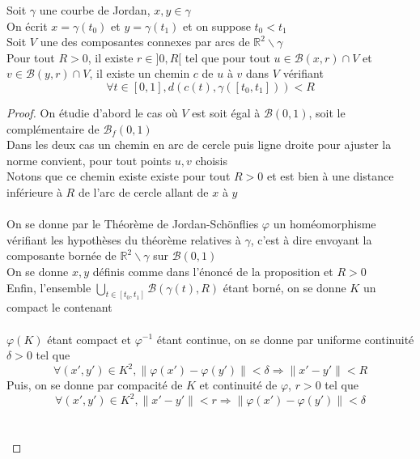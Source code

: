\documentclass{article}
\begin{document}
\begin{flushleft}
\begin{tcolorbox}[colback = purple!20!white, colframe = purple!60!white, title = Proposition 7]
    Soit $\gamma$ une courbe de Jordan, $x, y \in \gamma$\\
    On écrit $x = \gamma(t_0)$ et $y = \gamma(t_1)$ et on suppose $t_0 < t_1$\\
    Soit $V$ une des composantes connexes par arcs de $\mathbb{R}^2 \backslash \gamma$\\
    Pour tout $R > 0$, il existe $r \in ]0, R[$ tel que pour tout
    $u \in \mathcal{B}(x, r) \cap V$ et $v \in \mathcal{B}(y, r) \cap V$,
    il existe un chemin $c$ de $u$ à $v$ dans $V$ vérifiant
    \[ \forall t \in [0, 1], d(c(t), \gamma([t_0, t_1])) < R \]
\end{tcolorbox}

\begin{proof}
    On étudie d'abord le cas où $V$ est soit égal à $\mathcal{B}(0, 1)$, soit le complémentaire de $\mathcal{B}_f(0, 1)$\\
    Dans les deux cas un chemin en arc de cercle puis ligne droite pour ajuster la norme convient, pour tout points $u, v$ choisis\\
    Notons que ce chemin existe existe pour tout $R > 0$ et est bien à une distance inférieure à $R$ de l'arc de cercle allant
    de $x$ à $y$
    \\~\\
    On se donne par le Théorème de Jordan-Schönflies $\varphi$ un homéomorphisme vérifiant les hypothèses du théorème relatives
    à $\gamma$, c'est à dire envoyant la composante bornée de $\mathbb{R}^2 \backslash \gamma$ sur $\mathcal{B}(0, 1)$\\
    On se donne $x, y$ définis comme dans l'énoncé de la proposition et $R > 0$\\
    Enfin, l'ensemble $\bigcup_{t \in [t_0, t_1]} \mathcal{B}(\gamma(t), R)$
    étant borné, on se donne $K$ un compact le contenant
    \\~\\
    $\varphi(K)$ étant compact et $\varphi^{-1}$ étant continue, on se donne par uniforme continuité $\delta > 0$ tel que
    \[ \forall (x', y') \in K^2, \| \varphi(x') - \varphi(y') \| < \delta \Longrightarrow \| x' - y' \| < R \]
    Puis, on se donne par compacité de $K$ et continuité de $\varphi$, $r > 0$ tel que
    \[ \forall (x', y') \in K^2, \| x' - y'\| < r \Longrightarrow \| \varphi(x') - \varphi(y') \| < \delta \]
    \\~\\

\end{proof}
\end{flushleft}
\end{document}
